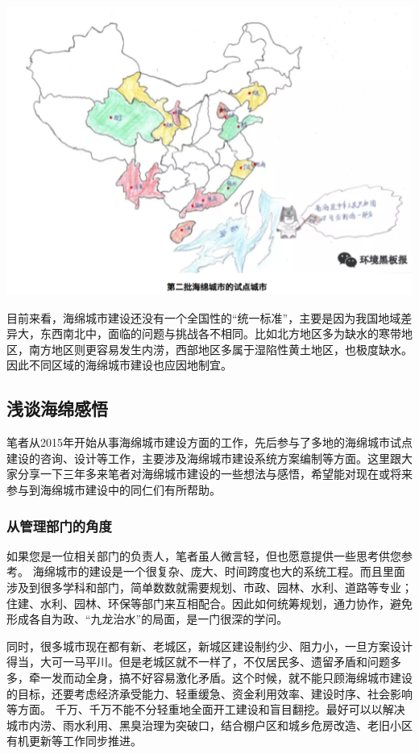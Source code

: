 \documentclass[]{book}
\begin{document}
\includegraphics[width=6.67in]{images/ch6}

目前来看，海绵城市建设还没有一个全国性的``统一标准''，主要是因为我国地域差异大，东西南北中，面临的问题与挑战各不相同。比如北方地区多为缺水的寒带地区，南方地区则更容易发生内涝，西部地区多属于湿陷性黄土地区，也极度缺水。因此不同区域的海绵城市建设也应因地制宜。

\subsection{浅谈海绵感悟}

笔者从2015年开始从事海绵城市建设方面的工作，先后参与了多地的海绵城市试点建设的咨询、设计等工作，主要涉及海绵城市建设系统方案编制等方面。这里跟大家分享一下三年多来笔者对海绵城市建设的一些想法与感悟，希望能对现在或将来参与到海绵城市建设中的同仁们有所帮助。

\subsubsection{从管理部门的角度}

如果您是一位相关部门的负责人，笔者虽人微言轻，但也愿意提供一些思考供您参考。
海绵城市的建设是一个很复杂、庞大、时间跨度也大的系统工程。而且里面涉及到很多学科和部门，简单数数就需要规划、市政、园林、水利、道路等专业；住建、水利、园林、环保等部门来互相配合。因此如何统筹规划，通力协作，避免形成各自为政、``九龙治水''的局面，是一门很深的学问。

同时，很多城市现在都有新、老城区，新城区建设制约少、阻力小，一旦方案设计得当，大可一马平川。但是老城区就不一样了，不仅居民多、遗留矛盾和问题多多，牵一发而动全身，搞不好容易激化矛盾。这个时候，就不能只顾海绵城市建设的目标，还要考虑经济承受能力、轻重缓急、资金利用效率、建设时序、社会影响等方面。
千万、千万不能不分轻重地全面开工建设和盲目翻挖。最好可以以解决城市内涝、雨水利用、黑臭治理为突破口，结合棚户区和城乡危房改造、老旧小区有机更新等工作同步推进。
\end{document}
